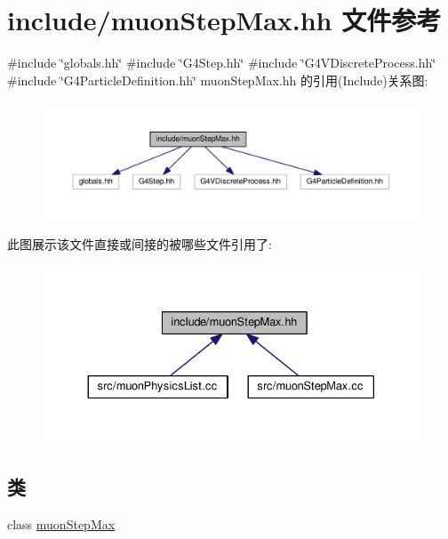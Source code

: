 \hypertarget{muonStepMax_8hh}{}\section{include/muon\+Step\+Max.hh 文件参考}
\label{muonStepMax_8hh}
{\ttfamily \#include \char`\"{}globals.\+hh\char`\"{}}\newline
{\ttfamily \#include \char`\"{}G4\+Step.\+hh\char`\"{}}\newline
{\ttfamily \#include \char`\"{}G4\+V\+Discrete\+Process.\+hh\char`\"{}}\newline
{\ttfamily \#include \char`\"{}G4\+Particle\+Definition.\+hh\char`\"{}}\newline
muon\+Step\+Max.\+hh 的引用(Include)关系图\+:\nopagebreak
\begin{figure}[H]
\begin{center}
\leavevmode
\includegraphics[width=350pt]{muonStepMax_8hh__incl}
\end{center}
\end{figure}
此图展示该文件直接或间接的被哪些文件引用了\+:\nopagebreak
\begin{figure}[H]
\begin{center}
\leavevmode
\includegraphics[width=330pt]{muonStepMax_8hh__dep__incl}
\end{center}
\end{figure}
\subsection*{类}
\begin{DoxyCompactItemize}
\item 
class \hyperlink{classmuonStepMax}{muon\+Step\+Max}
\end{DoxyCompactItemize}
